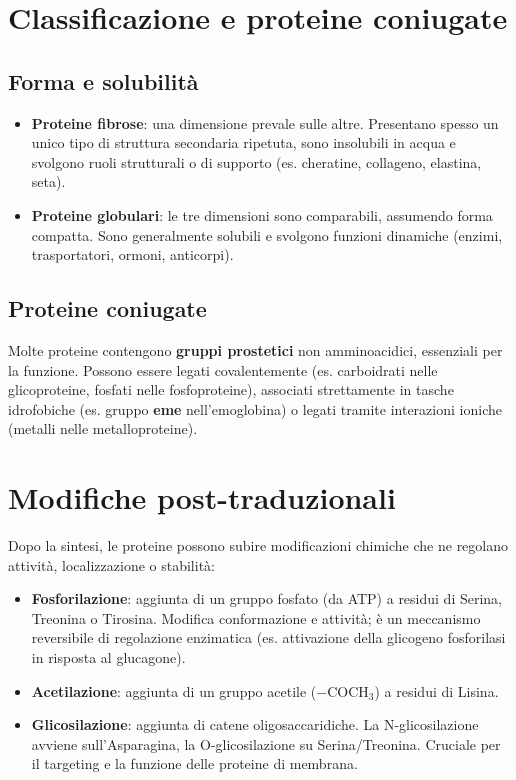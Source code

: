 \documentclass[12pt,a4paper]{report}
\begin{document}
\section{Classificazione e proteine coniugate}
\subsection{Forma e solubilità}
\begin{itemize}
\item \textbf{Proteine fibrose}: una dimensione prevale sulle altre. Presentano spesso un unico tipo di struttura secondaria ripetuta, sono insolubili in acqua e svolgono ruoli strutturali o di supporto (es. cheratine, collageno, elastina, seta).
\item \textbf{Proteine globulari}: le tre dimensioni sono comparabili, assumendo forma compatta. Sono generalmente solubili e svolgono funzioni dinamiche (enzimi, trasportatori, ormoni, anticorpi).
\end{itemize}

\subsection{Proteine coniugate}
Molte proteine contengono \textbf{gruppi prostetici} non amminoacidici, essenziali per la funzione. Possono essere legati covalentemente (es. carboidrati nelle glicoproteine, fosfati nelle fosfoproteine), associati strettamente in tasche idrofobiche (es. gruppo \textbf{eme} nell'emoglobina) o legati tramite interazioni ioniche (metalli nelle metalloproteine).

\section{Modifiche post-traduzionali}
Dopo la sintesi, le proteine possono subire modificazioni chimiche che ne regolano attività, localizzazione o stabilità:
\begin{itemize}
\item \textbf{Fosforilazione}: aggiunta di un gruppo fosfato (da ATP) a residui di Serina, Treonina o Tirosina. Modifica conformazione e attività; è un meccanismo reversibile di regolazione enzimatica (es. attivazione della glicogeno fosforilasi in risposta al glucagone).
\item \textbf{Acetilazione}: aggiunta di un gruppo acetile (\(-\mathrm{COCH_3}\)) a residui di Lisina.
\item \textbf{Glicosilazione}: aggiunta di catene oligosaccaridiche. La N-glicosilazione avviene sull'Asparagina, la O-glicosilazione su Serina/Treonina. Cruciale per il targeting e la funzione delle proteine di membrana.
\end{itemize}
\end{document}

